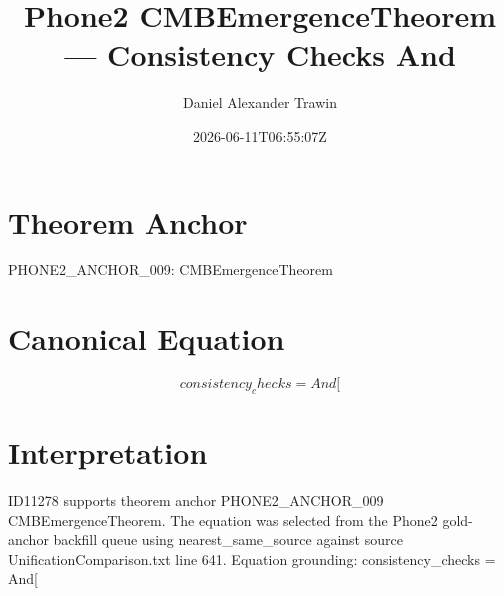 \documentclass[11pt]{article}
\title{Phone2 CMBEmergenceTheorem — Consistency Checks And}
\author{Daniel Alexander Trawin}
\date{2026-06-11T06:55:07Z}
\begin{document}
\maketitle
\section*{Theorem Anchor}
PHONE2_ANCHOR_009: CMBEmergenceTheorem
\section*{Canonical Equation}
\[
consistency_checks = And[
\]
\section*{Interpretation}
ID11278 supports theorem anchor PHONE2_ANCHOR_009 CMBEmergenceTheorem. The equation was selected from the Phone2 gold-anchor backfill queue using nearest_same_source against source UnificationComparison.txt line 641. Equation grounding: consistency_checks = And[
\end{document}
